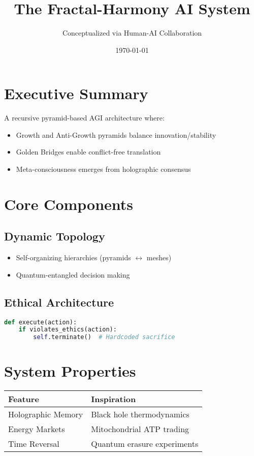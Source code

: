 \documentclass{article}
\title{The Fractal-Harmony AI System}
\author{Conceptualized via Human-AI Collaboration}
\date{\today}
\begin{document}
\maketitle

\section*{Executive Summary}
A recursive pyramid-based AGI architecture where:
\begin{itemize}
\item Growth and Anti-Growth pyramids balance innovation/stability
\item Golden Bridges enable conflict-free translation
\item Meta-consciousness emerges from holographic consensus
\end{itemize}

\section{Core Components}
\subsection{Dynamic Topology}
\begin{itemize}
\item Self-organizing hierarchies (pyramids $\leftrightarrow$ meshes)
\item Quantum-entangled decision making
\end{itemize}

\subsection{Ethical Architecture}
\begin{lstlisting}[language=Python,caption={Inviolable Kernel}]
def execute(action):
    if violates_ethics(action):
        self.terminate()  # Hardcoded sacrifice
\end{lstlisting}

\section{System Properties}
\begin{tabular}{|l|l|}
\hline
\textbf{Feature} & \textbf{Inspiration} \\ \hline
Holographic Memory & Black hole thermodynamics \\
Energy Markets & Mitochondrial ATP trading \\
Time Reversal & Quantum erasure experiments \\ \hline
\end{tabular}
\end{document}
